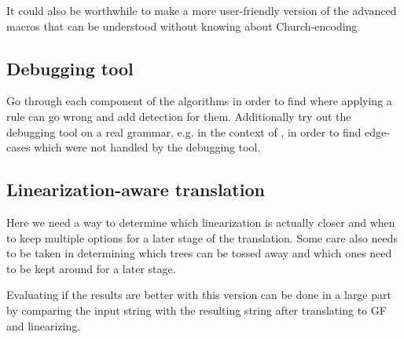 \documentclass{article}
\begin{document}
It could also be worthwhile to make a more user-friendly version of the advanced macros that can be understood without knowing about Church-encoding

\subsection{Debugging tool}
Go through each component of the algorithms in order to find where applying a rule can go wrong and add detection for them. Additionally try out the debugging tool on a real grammar, e.g. in the context of \cite{listenmaa-etal-2021-towards}, in order to find edge-cases which were not handled by the debugging tool.


\subsection{Linearization-aware translation}
Here we need a way to determine which linearization is actually closer and when to keep multiple options for a later stage of the translation. Some care also needs to be taken in determining which trees can be tossed away and which ones need to be kept around for a later stage.

Evaluating if the results are better with this version can be done in a large part by comparing the input string with the resulting string after translating to GF and linearizing.
\end{document}
